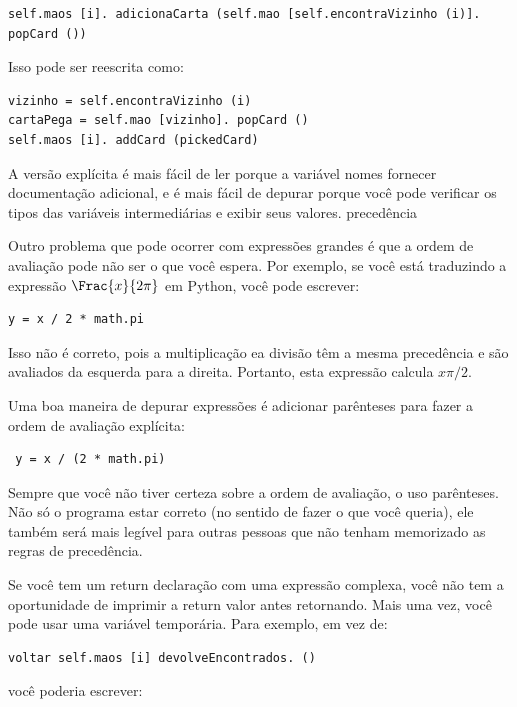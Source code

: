 \documentclass[10pt]{book}
\begin{document}
\begin{v erbatim}
\begin{verbatim}
self.maos [i]. adicionaCarta (self.mao [self.encontraVizinho (i)]. popCard ())
\end{verbatim}
%
Isso pode ser reescrita como:

\begin{verbatim}
vizinho = self.encontraVizinho (i)
cartaPega = self.mao [vizinho]. popCard ()
self.maos [i]. addCard (pickedCard)
\end{verbatim}
%
A versão explícita é mais fácil de ler porque a variável
nomes fornecer documentação adicional, e é mais fácil de depurar
porque você pode verificar os tipos das variáveis ​​intermediárias
e exibir seus valores.
\index{} precedência

Outro problema que pode ocorrer com expressões grandes é
que a ordem de avaliação pode não ser o que você espera.
Por exemplo, se você está traduzindo a expressão
$ \Frac {x} {2 \pi} $ em Python, você pode escrever:

\begin{verbatim}
y = x / 2 * math.pi
\end{verbatim}
%
Isso não é correto, pois a multiplicação ea divisão têm
a mesma precedência e são avaliados da esquerda para a direita.
Portanto, esta expressão calcula $ x \pi / 2 $.

Uma boa maneira de depurar expressões é adicionar parênteses para fazer
a ordem de avaliação explícita:

\begin{verbatim}
 y = x / (2 * math.pi)
\end{verbatim}
%
Sempre que você não tiver certeza sobre a ordem de avaliação, o uso
parênteses. Não só o programa estar correto (no sentido
de fazer o que você queria), ele também será mais legível para
outras pessoas que não tenham memorizado as regras de precedência.



Se você tem um {return \tt} declaração com uma expressão complexa,
você não tem a oportunidade de imprimir a {return \tt} valor antes
retornando. Mais uma vez, você pode usar uma variável temporária. Para
exemplo, em vez de:

\begin{verbatim}
voltar self.maos [i] devolveEncontrados. ()
\end{verbatim}
%
você poderia escrever:


\end{v erbatim}
\end{document}
